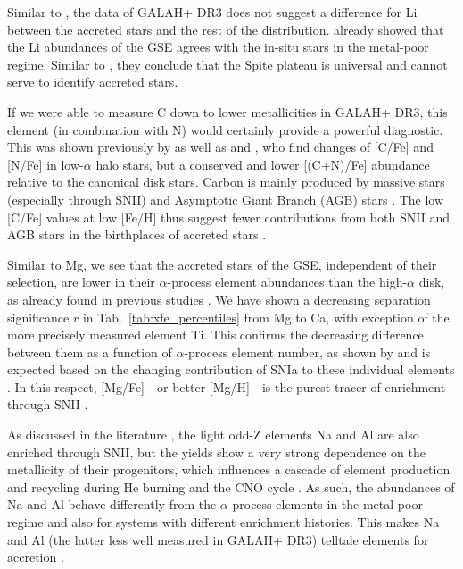 \documentclass[fleqn,usenatbib]{mnras}
\begin{document}
Similar to \citet{Nissen2012}, the data of GALAH+ DR3 does not suggest a difference for Li between the accreted stars and the rest of the distribution. \citet{Simpson2021} already showed that the Li abundances of the GSE agrees with the in-situ stars in the metal-poor regime. Similar to \citet{Molaro2020}, they conclude that the Spite plateau is universal and cannot serve to identify accreted stars.

If we were able to measure C down to lower metallicities in GALAH+ DR3, this element (in combination with N) would certainly provide a powerful diagnostic. This was shown previously by \citet{Nissen2014} as well as \citet{Hawkins2015} and \citet{Hayes2018}, who find changes of [C/Fe] and [N/Fe] in low-$\alpha$ halo stars, but a conserved and lower [(C+N)/Fe] abundance relative to the canonical disk stars. Carbon is mainly produced by massive stars (especially through SNII) and Asymptotic Giant Branch (AGB) stars \citep{Kobayashi2020}. The low [C/Fe] values at low [Fe/H] thus suggest fewer contributions from both SNII and AGB stars in the birthplaces of accreted stars \citep[see][for further discussion]{Nissen2014}.

Similar to Mg, we see that the accreted stars of the GSE, independent of their selection, are lower in their $\alpha$-process element abundances than the high-$\alpha$ disk, as already found in previous studies \citep{Venn2004, Nissen2010, Hawkins2015, Hayes2018, Mackereth2019, Koppelman2019, Koppelman2021, Recio-Blanco2021, DiMatteo2020, Matsuno2021}. We have shown a decreasing separation significance $r$ in Tab.~\ref{tab:xfe_percentiles} from Mg to Ca, with exception of the more precisely measured element Ti. This confirms the decreasing difference between them as a function of $\alpha$-process element number, as shown by \citet{Hayes2018} and is expected based on the changing contribution of SNIa to these individual elements \citep{Tsujimoto1995,Kobayashi2020b}. In this respect, [Mg/Fe] - or better [Mg/H] \citep{Feuillet2021} - is the purest tracer of enrichment through SNII \citep[e.g.][]{Kobayashi2020}.

As discussed in the literature \citep{Nissen2010, Hawkins2015, Hayes2018}, the light odd-Z elements Na and Al are also enriched through SNII, but the yields show a very strong dependence on the metallicity of their progenitors, which influences a cascade of element production and recycling during He burning and the CNO cycle \citep[e.g.][]{Woosley2002, Kobayashi2006, Kobayashi2020}. As such, the abundances of Na and Al behave differently from the $\alpha$-process elements in the metal-poor regime and also for systems with different enrichment histories. This makes Na and Al (the latter less well measured in GALAH+ DR3) telltale elements for accretion \citep[see also][]{Kobayashi2011, Ting2012}.
\end{document}
